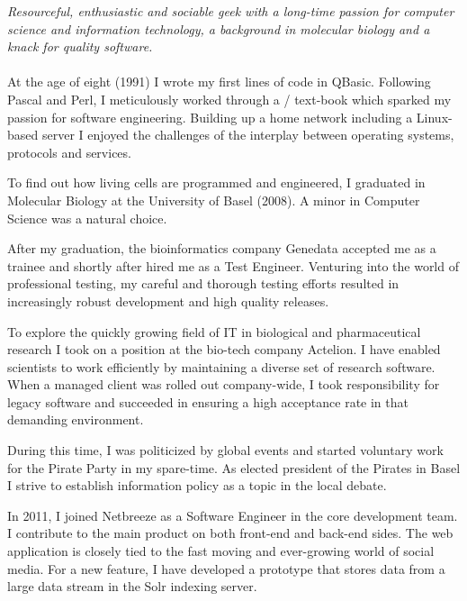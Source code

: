 \documentclass[10pt,a4paper]{article}
\begin{document}
\vspace{-1.3em}  %
\begin{multicols}{2}  %
\noindent \emph{Resourceful, enthusiastic and sociable geek with a long-time passion for computer science and information technology, a background in molecular biology and a knack for quality software.}
\\
\\
At the age of eight (1991) I wrote my first lines of code in QBasic. Following Pascal and Perl, I meticulously worked through a / text-book which  sparked my passion for software engineering.  Building up a home network including a Linux-based server I enjoyed the challenges of the interplay between operating systems, protocols and services.

To find out how living cells are programmed and engineered, I graduated in Molecular Biology at the University of Basel (2008). A minor in Computer Science was a natural choice.

After my graduation, the bioinformatics company Genedata accepted me as a trainee and shortly after hired me as a Test Engineer. Venturing into the world of professional testing, my careful and thorough testing efforts resulted in increasingly robust development and high quality releases.

To explore the quickly growing field of IT in biological and pharmaceutical research I took on a position at the bio-tech company Actelion. I have enabled scientists to work efficiently by maintaining a diverse set of research software. When a managed client was rolled out company-wide, I took responsibility for legacy software and succeeded in ensuring a high acceptance rate in that demanding environment.

During this time, I was politicized by global events and started voluntary work for the Pirate Party in my spare-time. As elected president of the Pirates in Basel I strive to establish information policy as a topic in the local debate.

In 2011, I joined Netbreeze as a Software Engineer in the core development team. I contribute to the main product on both front-end and back-end sides. The web application is closely tied to the fast moving and ever-growing world of social media. For a new feature, I have developed a prototype that stores data from a large data stream in the Solr indexing server.
\end{multicols}
\end{document}
